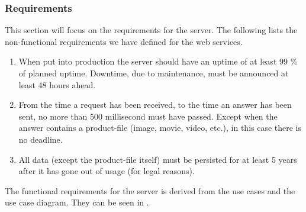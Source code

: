 \subsubsection{Requirements}
\label{s_serviceRequirements}
This section will focus on the requirements for the server. The following lists the non-functional requirements we have defined for the web services.

\begin{enumerate}[label=NFR-\arabic*]
	\item When put into production the server should have an uptime of at least 99 \% of planned uptime. Downtime, due to maintenance, must be announced at least 48 hours ahead.
	
	\item From the time a request has been received, to the time an answer has been sent, no more than 500 millisecond must have passed. Except when the answer contains a product-file (image, movie, video, etc.), in this case there is no deadline.
	
	\item All data (except the product-file itself) must be persisted for at least 5 years after it has gone out of usage (for legal reasons).
\end{enumerate}

The functional requirements for the server is derived from the use cases  and the use case diagram. They can be seen in .



